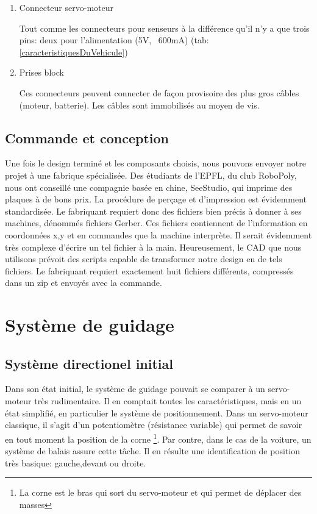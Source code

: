 \documentclass[a4paper,11pt]{report}
\begin{document}
{\begin{enumerate}
\item Connecteur servo-moteur

Tout comme les connecteurs pour senseurs à la différence qu'il n'y a que trois pins: deux pour l'alimentation (5V, ~600mA) (tab:
\ref{caracteristiquesDuVehicule})


\item Prises block

Ces connecteurs peuvent connecter de façon provisoire des plus gros câbles (moteur, batterie). Les câbles sont immobilisés au moyen de vis.

\end{enumerate}

\subsection{Commande et conception}
Une fois le design terminé et les composants choisis, nous pouvons envoyer
notre projet à une fabrique spécialisée. Des étudiants de l'EPFL, du club
RoboPoly, nous ont conseillé une compagnie basée en chine, SeeStudio, qui imprime des
plaques à de bons prix. La procédure de perçage et d'impression est évidemment
standardisée. Le fabriquant requiert donc des fichiers bien précis à donner à
ses machines, dénommés fichiers Gerber. Ces fichiers contiennent de
l'information en coordonnées x,y et en commandes que la machine interprète. Il
serait évidemment très complexe d'écrire un tel fichier à la
main. Heureusement, le CAD que nous utilisons prévoit des scripts capable de
transformer notre design en de tels fichiers. Le fabriquant requiert
exactement huit fichiers différents, compressés dans un zip et envoyés avec la commande.  


\section{Système de guidage}


\subsection{Système directionel initial}
Dans son état initial, le système de guidage pouvait se comparer à un
servo-moteur très rudimentaire. Il en comptait toutes les caractéristiques, mais en
un état simplifié, en particulier le système de positionnement. Dans un servo-moteur
classique, il s'agit d'un potentiomètre (résistance variable) qui permet
de savoir en tout moment la position de la corne \footnote{La corne est le bras qui sort du servo-moteur et qui permet de déplacer des masses}. Par contre, dans le cas de
la voiture, un système de balais assure cette tâche. Il en
résulte une identification de position très basique: gauche,devant ou
droite.

}
\end{document}

